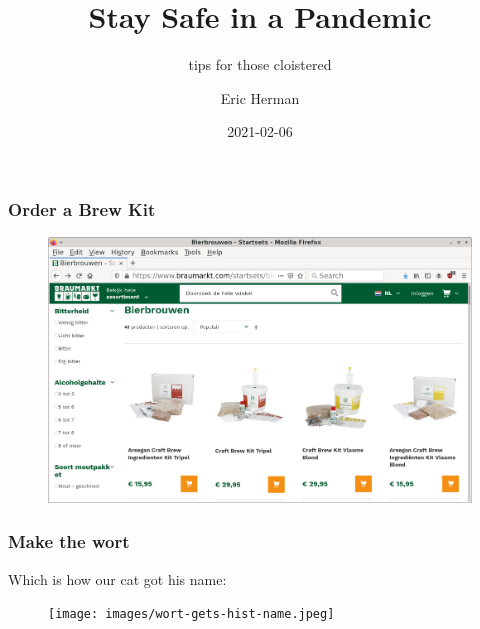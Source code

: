 \documentclass{beamer}
\title{Stay Safe in a Pandemic}
\subtitle{tips for those cloistered}
\author{Eric Herman}
\date{2021-02-06}
\begin{document}
\frame{\titlepage}

\begin{frame}
\frametitle{Order a Brew Kit}
\begin{figure}
\includegraphics[width=\linewidth]{images/get-a-brew-kit.png}
\end{figure}
\end{frame}

\begin{frame}
\frametitle{Make the wort}
Which is how our cat got his name:
\begin{figure}
\texttt{[image: images/wort-gets-hist-name.jpeg]}
\end{figure}
\end{frame}
\end{document}
